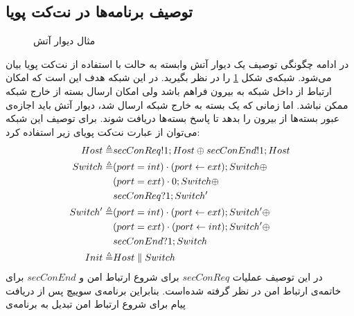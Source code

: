 \subsection{توصیف برنامه‌ها در نت‌کت پویا}

\begin{figure}
    \centering
    \caption{مثال دیوار آتش}
    \label{fig:dynetkat:firewall}
\end{figure}
در ادامه چگونگی توصیف یک دیوار آتش
وابسته به حالت
با استفاده از نت‌کت پویا بیان می‌شود.
شبکه‌ی شکل
\ref{fig:dynetkat:firewall}
را در نظر بگیرید.
در این شبکه هدف این است که امکان ارتباط از داخل شبکه به بیرون فراهم باشد ولی امکان ارسال بسته از خارج شبکه ممکن نباشد.
اما زمانی که یک بسته به خارج شبکه ارسال شد، دیوار آتش باید اجازه‌ی عبور بسته‌ها از بیرون را بدهد تا پاسخ بسته‌ها دریافت شوند.
برای توصیف این شبکه می‌توان از عبارت نت‌کت پویای زیر استفاده کرد:
\begin{align*}
    Host  \triangleq   & secConReq!1;Host \oplus secConEnd!1;Host        \\
    Switch \triangleq  & (port = int) \cdot (port \leftarrow ext);Switch \oplus \\
                       & (port = ext)\cdot 0 ; Switch \oplus             \\
                       & secConReq?1;Switch'                             \\
    Switch' \triangleq & (port =int) \cdot (port \leftarrow ext);Switch' \oplus \\
                       & (port=ext)\cdot(port\leftarrow int);Switch' \oplus     \\
                       & secConEnd?1;Switch                              \\
    Init \triangleq    & Host \parallel Switch
\end{align*}
در این توصیف عملیات 
$secConReq$
برای شروع ارتباط امن و
$secConEnd$
برای خاتمه‌ی ارتباط امن در نظر گرفته شده‌است.
بنابراین برنامه‌ی سوییچ پس از دریافت پیام برای شروع ارتباط امن تبدیل به برنامه‌ی 
